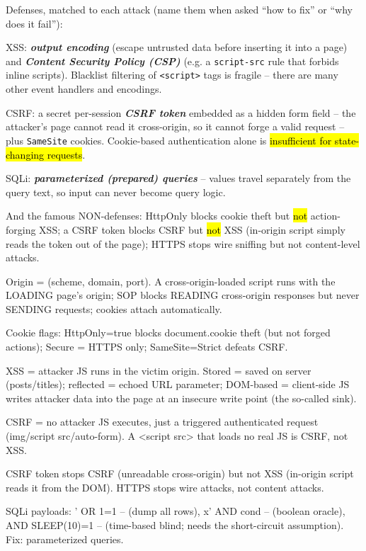 \documentclass[12pt, a4paper]{article}
\newcommand{\term}[1]{\textbf{\textit{#1}}}        %
\newcommand{\imp}[1]{\hl{#1}}                       %
\begin{document}
Defenses, matched to each attack (name them when asked ``how to fix'' or ``why does it fail''):\begin{tightitem}\item XSS: \term{output encoding} (escape untrusted data before inserting it into a page) and \term{Content Security Policy (CSP)} (e.g. a \texttt{script-src} rule that forbids inline scripts). Blacklist filtering of \texttt{<script>} tags is fragile -- there are many other event handlers and encodings.\item CSRF: a secret per-session \term{CSRF token} embedded as a hidden form field -- the attacker's page cannot read it cross-origin, so it cannot forge a valid request -- plus \texttt{SameSite} cookies. Cookie-based authentication alone is \imp{insufficient for state-changing requests}.\item SQLi: \term{parameterized (prepared) queries} -- values travel separately from the query text, so input can never become query logic.\end{tightitem}And the famous NON-defenses: HttpOnly blocks cookie theft but \imp{not} action-forging XSS; a CSRF token blocks CSRF but \imp{not} XSS (in-origin script simply reads the token out of the page); HTTPS stops wire sniffing but not content-level attacks.

\begin{theorybox}
\begin{tightitem}
    \item Origin = (scheme, domain, port). A cross-origin-loaded script runs with the LOADING page's origin; SOP blocks READING cross-origin responses but never SENDING requests; cookies attach automatically.
    \item Cookie flags: HttpOnly=true blocks document.cookie theft (but not forged actions); Secure = HTTPS only; SameSite=Strict defeats CSRF.
    \item XSS = attacker JS runs in the victim origin. Stored = saved on server (posts/titles); reflected = echoed URL parameter; DOM-based = client-side JS writes attacker data into the page at an insecure write point (the so-called sink).
    \item CSRF = no attacker JS executes, just a triggered authenticated request (img/script src/auto-form). A <script src> that loads no real JS is CSRF, not XSS.
    \item CSRF token stops CSRF (unreadable cross-origin) but not XSS (in-origin script reads it from the DOM). HTTPS stops wire attacks, not content attacks.
    \item SQLi payloads: ' OR 1=1 -- (dump all rows), x' AND cond -- (boolean oracle), AND SLEEP(10)=1 -- (time-based blind; needs the short-circuit assumption). Fix: parameterized queries.
\end{tightitem}
\end{theorybox}
\end{document}
